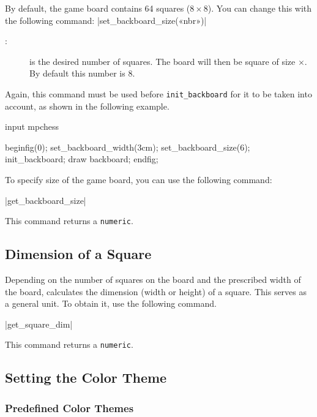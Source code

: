 \documentclass[english]{ltxdoc}
\begin{document}
By default, the game board contains 64 squares ($8\times 8$). You can change
this with the following command: 
\commande|set_backboard_size(«nbr»)|
\smallskip{}

\begin{description}
  \item[:] is the desired number of squares. The board will then be
  square of size $\times$. By default this number is 8. 
\end{description}

Again, this command must be used before \lstinline+init_backboard+ for it to be
taken into account, as shown in the following example. 

\begin{ExempleMP}[label=ex:widthcase]
input mpchess

beginfig(0);
set_backboard_width(3cm);
set_backboard_size(6);
init_backboard;
draw backboard;
endfig;
\end{ExempleMP}

To specify size of the game board, you can use the following command:
 

\commande|get_backboard_size|\smallskip{}

This command returns a \lstinline+numeric+.

\subsection{Dimension of a Square}

Depending on the number of squares on the board and the prescribed width of the board, \mpchess calculates the dimension (width or height) of a square. This
serves as a general unit. To obtain it, use the following command.

\commande|get_square_dim|\smallskip{}

This command returns a \lstinline+numeric+.

\subsection{Setting the Color Theme}

\subsubsection{Predefined Color Themes}
\end{document}
